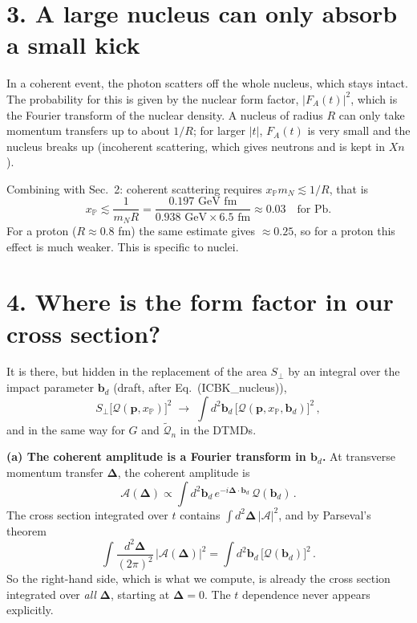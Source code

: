 \documentclass[12pt]{article}
\begin{document}
\section*{3. A large nucleus can only absorb a small kick}

In a coherent event, the photon scatters off the whole nucleus, which stays intact. The probability
for this is given by the nuclear form factor, $|F_A(t)|^2$, which is the Fourier transform of the
nuclear density. A nucleus of radius $R$ can only take momentum transfers up to about $1/R$; for
larger $|t|$, $F_A(t)$ is very small and the nucleus breaks up (incoherent scattering, which gives
neutrons and is kept in $Xn$).

Combining with Sec.~2: coherent scattering requires $x_{\mathbb P}m_N\lesssim1/R$, that is
\begin{equation}
  x_{\mathbb P}\lesssim\frac{1}{m_NR}=\frac{0.197\text{ GeV fm}}{0.938\text{ GeV}\times6.5\text{ fm}}
  \approx0.03 \quad\text{for Pb.}
\end{equation}
For a proton ($R\approx0.8$ fm) the same estimate gives $\approx0.25$, so for a proton this effect
is much weaker. This is specific to nuclei.

\section*{4. Where is the form factor in our cross section?}

It is there, but hidden in the replacement of the area $S_\perp$ by an integral over the impact
parameter $\mathbf b_d$ (draft, after Eq.~(ICBK\_nucleus)),
\begin{equation}
  S_\perp\big[\mathcal Q(\mathbf p,x_{\mathbb P})\big]^2\;\to\;
  \int d^2\mathbf b_d\,\big[\mathcal Q(\mathbf p,x_{\mathbb P},\mathbf b_d)\big]^2\,,
\end{equation}
and in the same way for $G$ and $\tilde{\mathcal Q}_n$ in the DTMDs.

\textbf{(a) The coherent amplitude is a Fourier transform in $\mathbf b_d$.} At transverse momentum
transfer $\boldsymbol\Delta$, the coherent amplitude is
\begin{equation}
  \mathcal A(\boldsymbol\Delta)\propto\int d^2\mathbf b_d\,e^{-i\boldsymbol\Delta\cdot\mathbf b_d}\,
  \mathcal Q(\mathbf b_d)\,.
\end{equation}
The cross section integrated over $t$ contains $\int d^2\boldsymbol\Delta\,|\mathcal A|^2$, and by
Parseval's theorem
\begin{equation}
  \int\frac{d^2\boldsymbol\Delta}{(2\pi)^2}\,\big|\mathcal A(\boldsymbol\Delta)\big|^2
  =\int d^2\mathbf b_d\,\big[\mathcal Q(\mathbf b_d)\big]^2\,.
\end{equation}
So the right-hand side, which is what we compute, is already the cross section integrated over
\emph{all} $\boldsymbol\Delta$, starting at $\boldsymbol\Delta=0$. The $t$ dependence never appears
explicitly.
\end{document}

